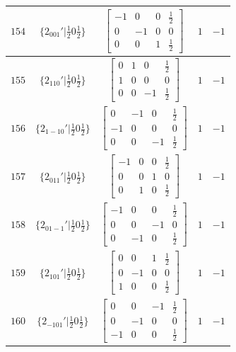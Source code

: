 \documentclass[fleqn,8pt]{jsarticle}
\begin{document}
\begin{longtable}{ccccc}
$ 154 $ & $ \{2{}_{001}{}'|\frac{1}{2} 0 \frac{1}{2}\} $ & $ \begin{bmatrix} -1 & 0 & 0 & \frac{1}{2} \\ 0 & -1 & 0 & 0 \\ 0 & 0 & 1 & \frac{1}{2} \end{bmatrix} $ & $ 1 $ & $ -1 $ \\ \hline
$ 155 $ & $ \{2{}_{110}{}'|\frac{1}{2} 0 \frac{1}{2}\} $ & $ \begin{bmatrix} 0 & 1 & 0 & \frac{1}{2} \\ 1 & 0 & 0 & 0 \\ 0 & 0 & -1 & \frac{1}{2} \end{bmatrix} $ & $ 1 $ & $ -1 $ \\ \hline
$ 156 $ & $ \{2{}_{1-10}{}'|\frac{1}{2} 0 \frac{1}{2}\} $ & $ \begin{bmatrix} 0 & -1 & 0 & \frac{1}{2} \\ -1 & 0 & 0 & 0 \\ 0 & 0 & -1 & \frac{1}{2} \end{bmatrix} $ & $ 1 $ & $ -1 $ \\ \hline
$ 157 $ & $ \{2{}_{011}{}'|\frac{1}{2} 0 \frac{1}{2}\} $ & $ \begin{bmatrix} -1 & 0 & 0 & \frac{1}{2} \\ 0 & 0 & 1 & 0 \\ 0 & 1 & 0 & \frac{1}{2} \end{bmatrix} $ & $ 1 $ & $ -1 $ \\ \hline
$ 158 $ & $ \{2{}_{01-1}{}'|\frac{1}{2} 0 \frac{1}{2}\} $ & $ \begin{bmatrix} -1 & 0 & 0 & \frac{1}{2} \\ 0 & 0 & -1 & 0 \\ 0 & -1 & 0 & \frac{1}{2} \end{bmatrix} $ & $ 1 $ & $ -1 $ \\ \hline
$ 159 $ & $ \{2{}_{101}{}'|\frac{1}{2} 0 \frac{1}{2}\} $ & $ \begin{bmatrix} 0 & 0 & 1 & \frac{1}{2} \\ 0 & -1 & 0 & 0 \\ 1 & 0 & 0 & \frac{1}{2} \end{bmatrix} $ & $ 1 $ & $ -1 $ \\ \hline
$ 160 $ & $ \{2{}_{-101}{}'|\frac{1}{2} 0 \frac{1}{2}\} $ & $ \begin{bmatrix} 0 & 0 & -1 & \frac{1}{2} \\ 0 & -1 & 0 & 0 \\ -1 & 0 & 0 & \frac{1}{2} \end{bmatrix} $ & $ 1 $ & $ -1 $ \\ \hline

\end{longtable}
\end{document}
